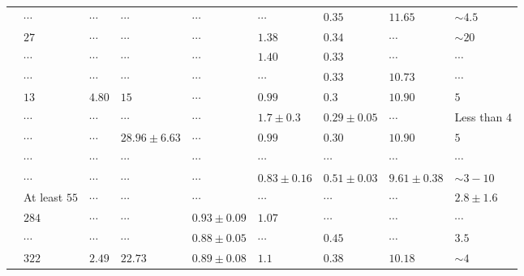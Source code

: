 \documentclass[fleqn,usenatbib,usedcolumn,useAMS]{mnras}
\begin{document}
\begin{table}
{\begin{tabular}{@{}lllllllll@{}}
			\citet{1989MNRAS.236..263P} & $\cdots$      & $\cdots$ & $\cdots$         & $\cdots$          & $\cdots$      & $0.35$        & $11.65$        & $\sim 4.5$   \\
			\citet{1991MNRAS.249...76B} & $27$          & $\cdots$ & $\cdots$         & $\cdots$          & $1.38$        & $0.34$        & $\cdots$       & $\sim 20$    \\
			\citet{1994RMxAA..29..141F} & $\cdots$      & $\cdots$ & $\cdots$         & $\cdots$          & $1.40$        & $0.33$        & $\cdots$       & $\cdots$     \\
			\citet{2003AA...407..925R}  & $\cdots$      & $\cdots$ & $\cdots$         & $\cdots$          & $\cdots$      & $0.33$        & $10.73$        & $\cdots$     \\
			\citet{2005AA...438.1163K}  & $13$          & $4.80$    & $15$             & $\cdots$          & $0.99$        & $0.3$         & $10.90$        & $5$          \\
			\citet{2007AA...462..157P} &
			$\cdots$ &
			$\cdots$ &
			$\cdots$ &
			$\cdots$ &
			$1.7 \pm 0.3$ &
			$0.29 \pm 0.05$ &
			$\cdots$ &
			Less than $4$ \\
			\citet{2008AA...477..165P}  & $\cdots$      & $\cdots$ & $28.96 \pm 6.63$ & $\cdots$          & $0.99$       & $0.30$        & $10.90$       & $5$          \\
			\citet{2010AA...511A..25R}  & $\cdots$      & $\cdots$ & $\cdots$         & $\cdots$          & $\cdots$      & $\cdots$      & $\cdots$       & $\cdots$     \\
			\citet{2018AA...610A..30A} &
			$\cdots$ &
			$\cdots$ &
			$\cdots$ &
			$\cdots$ &
			$0.83 \pm 0.16$ &
			$0.51 \pm 0.03$ &
			$9.61\pm 0.38$ &
			$\sim 3-10$ \\
			\citet{2019MNRAS.484.5102K} & At least $55$ & $\cdots$ & $\cdots$         & $\cdots$          & $\cdots$      & $\cdots$      & $\cdots$       & $2.8\pm 1.6$ \\
			\citet{2021ApJ...923..129J} & $284$         & $\cdots$ & $\cdots$         & $0.93 \pm 0.09$ & $1.07$       & $\cdots$      & $\cdots$       & $\cdots$     \\
			\citet{2022ApJS..262....7H} & $\cdots$      & $\cdots$ & $\cdots$         & $0.88 \pm 0.05$ & $\cdots$      & $0.45$        & $\cdots$       & $3.5$        \\
			\citet{2024arXiv240305143H} & $322$         & $2.49$  & $22.73$         & $0.89 \pm 0.08$ & $1.1$         & $0.38$        & $10.18$       & $\sim 4$     \\

\end{tabular}}
\end{table}
\end{document}
